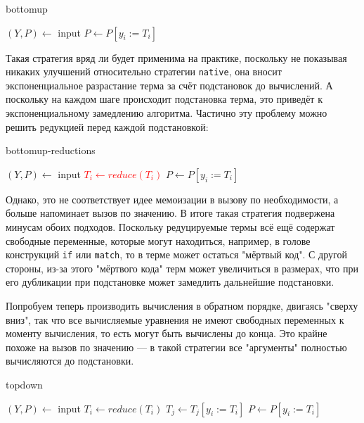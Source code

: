 \documentclass[../thesis.tex]{subfiles}
\begin{document}
\begin{megaalgorithm}
    \caption{bottomup}
  \begin{algorithmic}
    \State $(Y, P)\gets$ input
        \State $P \gets P [y_i := T_i]$
    \EndFor
    \State {}
  \end{algorithmic}
\end{megaalgorithm}

Такая стратегия вряд ли будет применима на практике, поскольку не показывая никаких улучшений относительно стратегии \texttt{native}, она вносит экспоненциальное разрастание терма за счёт подстановок до вычислений. А поскольку на каждом шаге происходит подстановка терма, это приведёт к экспоненциальному замедлению алгоритма. Частично эту проблему можно решить редукцией перед каждой подстановкой:

\begin{megaalgorithm}
    \caption{bottomup-reductions}
  \begin{algorithmic}
    \State $(Y, P)\gets$ input
        \State \textcolor{red}{$T_i \gets reduce(T_i)$}
        \State $P \gets P [y_i := T_i]$
    \EndFor
    \State {}
  \end{algorithmic}
\end{megaalgorithm}

Однако, это не соответствует идее мемоизации в вызову по необходимости, а больше напоминает вызов по значению. В итоге такая стратегия подвержена минусам обоих подходов. Поскольку редуцируемые термы всё ещё содержат свободные переменные, которые могут находиться, например, в голове конструкций \texttt{if} или \texttt{match}, то в терме может остаться "мёртвый код". С другой стороны, из-за этого "мёртвого кода" терм может увеличиться в размерах, что при его дубликации при подстановке может замедлить дальнейшие подстановки.

Попробуем теперь производить вычисления в обратном порядке, двигаясь "сверху вниз", так что все вычисляемые уравнения не имеют свободных переменных к моменту вычисления, то есть могут быть вычислены до конца. Это крайне похоже на вызов по значению --- в такой стратегии все "аргументы" полностью вычисляются до подстановки.

\begin{megaalgorithm}
    \caption{topdown}
  \begin{algorithmic}
    \State $(Y, P)\gets$ input
        \State $T_i \gets reduce(T_i)$
            \State $T_j \gets T_j [y_i := T_i]$
        \EndFor
        \State $P \gets P [y_i := T_i]$
    \EndFor
    \State {}
  \end{algorithmic}
\end{megaalgorithm} 
\end{document}
